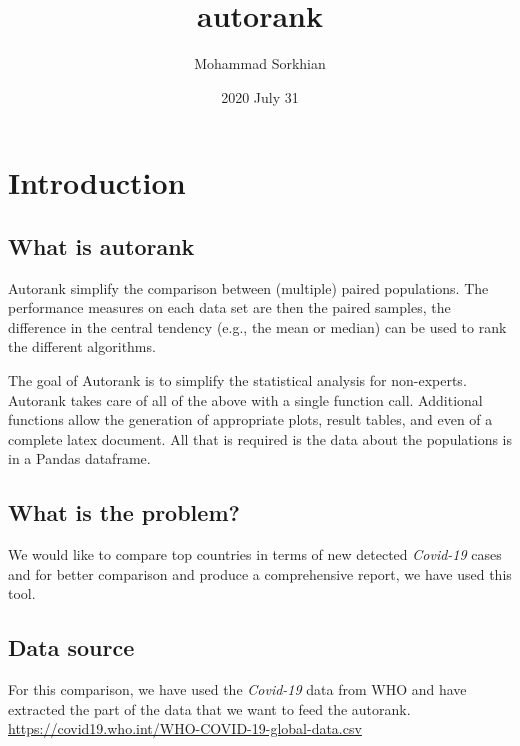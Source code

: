 \documentclass[12pt, letterpaper, twoside]{report}
\title{\textbf{autorank}}
\author{Mohammad Sorkhian}
\date{2020 July 31}
\begin{document}
\maketitle

\chapter{Introduction}
\section{What is \textbf{autorank}}
Autorank simplify the comparison between (multiple) paired populations. 
The performance measures on each data set are then the paired samples, 
the difference in the central tendency (e.g., the mean or median) 
can be used to rank the different algorithms.

The goal of Autorank is to simplify the statistical analysis for non-experts. 
Autorank takes care of all of the above with a single function call. 
Additional functions allow the generation of appropriate plots, result tables, 
and even of a complete latex document. All that is required is the data about 
the populations is in a Pandas dataframe.

\section{What is the problem?}
We would like to compare top countries in terms of new detected \textit{Covid-19} cases and 
for better comparison and produce a comprehensive report, we have used this tool.  

\section{Data source}
For this comparison, we have used the \textit{Covid-19} data from WHO and 
have extracted the part of the data that we want to feed the autorank.
\\ \url{https://covid19.who.int/WHO-COVID-19-global-data.csv}
\end{document}
